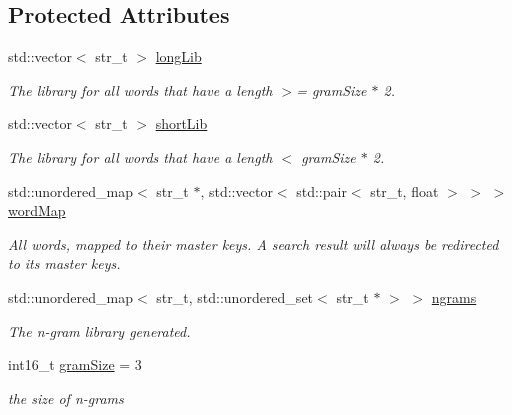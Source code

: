 \subsection*{Protected Attributes}
\begin{DoxyCompactItemize}
\item 
\mbox{\label{class_string_index_ac41713b30c0c373a3e9fc3efe13f9949}} 
std\+::vector$<$ str\+\_\+t $>$ \mbox{\hyperlink{class_string_index_ac41713b30c0c373a3e9fc3efe13f9949}{long\+Lib}}
\begin{DoxyCompactList}\small\item\em The library for all words that have a length $>$= {\ttfamily gram\+Size} $\ast$ 2. \end{DoxyCompactList}\item 
\mbox{\label{class_string_index_a4f0c00d4ace341b657ac1b233b70534b}} 
std\+::vector$<$ str\+\_\+t $>$ \mbox{\hyperlink{class_string_index_a4f0c00d4ace341b657ac1b233b70534b}{short\+Lib}}
\begin{DoxyCompactList}\small\item\em The library for all words that have a length $<$ {\ttfamily gram\+Size} $\ast$ 2. \end{DoxyCompactList}\item 
\mbox{\label{class_string_index_aaf98238698a0294638fb474c4962eac7}} 
std\+::unordered\+\_\+map$<$ str\+\_\+t $\ast$, std\+::vector$<$ std\+::pair$<$ str\+\_\+t, float $>$ $>$ $>$ \mbox{\hyperlink{class_string_index_aaf98238698a0294638fb474c4962eac7}{word\+Map}}
\begin{DoxyCompactList}\small\item\em All words, mapped to their master keys. A search result will always be redirected to its master keys. \end{DoxyCompactList}\item 
\mbox{\label{class_string_index_adae09412441dcac487fd942660ca72f5}} 
std\+::unordered\+\_\+map$<$ str\+\_\+t, std\+::unordered\+\_\+set$<$ str\+\_\+t $\ast$ $>$ $>$ \mbox{\hyperlink{class_string_index_adae09412441dcac487fd942660ca72f5}{ngrams}}
\begin{DoxyCompactList}\small\item\em The n-\/gram library generated. \end{DoxyCompactList}\item 
\mbox{\label{class_string_index_aadcaf2dd0a288b18d85febf8157de6be}} 
int16\+\_\+t \mbox{\hyperlink{class_string_index_aadcaf2dd0a288b18d85febf8157de6be}{gram\+Size}} = 3
\begin{DoxyCompactList}\small\item\em the size of n-\/grams \end{DoxyCompactList}\end{DoxyCompactItemize}


